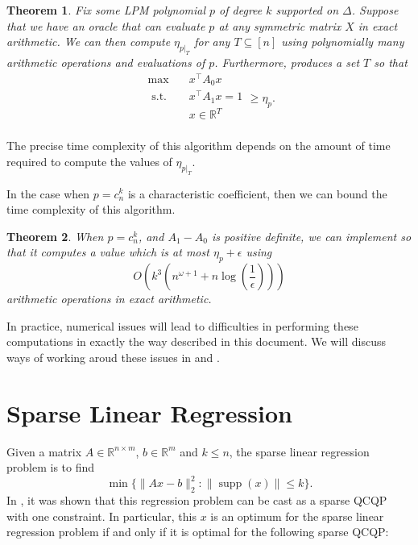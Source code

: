 \documentclass{amsart}
\newtheorem{theorem}{Theorem}[section]
\theoremstyle{definition}
\newcommand{\R}{\mathbb{R}}
\DeclareMathOperator*{\supp}{supp}
\newcommand{\st}{{\text{ s.t. }}}
\begin{document}
\begin{theorem}
    \label{thm:greedy_works}
    Fix some LPM polynomial $p$ of degree $k$ supported on $\Delta$.
    Suppose that we have an oracle that can evaluate $p$ at any symmetric matrix $X$ in exact arithmetic.
    We can then compute $\eta_{p|_{T}}$ for any $T \subseteq [n]$ using polynomially many arithmetic operations and evaluations of $p$.
    Furthermore,  produces a set $T$ so that
    \begin{equation}
        \begin{aligned}
            \max\quad & x^{\intercal}A_0x\\
            \st & x^{\intercal}A_1x = 1\\
                & x \in \R^T\\
        \end{aligned}
        \ge \eta_p.
    \end{equation}
\end{theorem}
The precise time complexity of this algorithm depends on the amount of time required to compute the values of $\eta_{p|_T}$.

In the case when $p = c_n^k$ is a characteristic coefficient, then we can bound the time complexity of this algorithm.
\begin{theorem}
    \label{thm:characteristic}
    When $p = c_n^k$, and $A_1 - A_0$ is positive definite, we can implement  so that it computes a value which is at most $\eta_p + \epsilon$ using
    \[
        O(k^3(n^{\omega+1} + n\log(\frac{1}{\epsilon})))
    \]
    arithmetic operations in exact arithmetic.
\end{theorem}

In practice, numerical issues will lead to difficulties in performing these computations in exactly the way described in this document. We will discuss ways of working aroud these issues in  and .



\section{Sparse Linear Regression}
\label{sec:sparseReg}
Given a matrix $A \in \R^{n \times m}$, $b \in \R^m$ and $k \le n$, the sparse linear regression problem is to find
\[
    \min \{ \|A x - b\|_2^2 : \|\supp(x)\| \le k\}.
\]
In \cite{ben2022new}, it was shown that this regression problem can be cast as a sparse QCQP with one constraint. In particular, this $x$ is an optimum for the sparse linear regression problem if and only if it is optimal for the following sparse QCQP:
\end{document}
